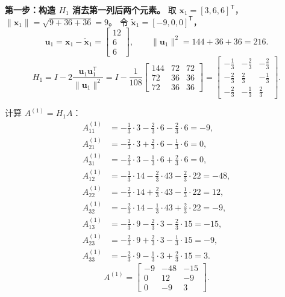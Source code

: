 \documentclass{article}
\begin{document}
\textbf{第一步：构造 $H_1$ 消去第一列后两个元素。}
取 $\bm{x}_1=[3,6,6]^{\mathsf T}$，$\|\bm{x}_1\|=\sqrt{9+36+36}=9$。
令 $\widetilde{\bm{x}}_1=[-9,0,0]^{\mathsf T}$，
\[
\bm{u}_1 = \bm{x}_1 - \widetilde{\bm{x}}_1 = \begin{bmatrix}12\\6\\6\end{bmatrix},\qquad
\|\bm{u}_1\|^2 = 144+36+36 = 216.
\]
\[
H_1 = I - 2\frac{\bm{u}_1\bm{u}_1^{\mathsf T}}{\|\bm{u}_1\|^2}
= I - \frac{1}{108}\begin{bmatrix}144 & 72 & 72\\72 & 36 & 36\\72 & 36 & 36\end{bmatrix}
= \begin{bmatrix}
-\frac13 & -\frac23 & -\frac23\\[4pt]
-\frac23 & \frac23 & -\frac13\\[4pt]
-\frac23 & -\frac13 & \frac23
\end{bmatrix}.
\]

计算 $A^{(1)} = H_1 A$：
\begin{align*}
A^{(1)}_{11} &= -\tfrac13\cdot3-\tfrac23\cdot6-\tfrac23\cdot6 = -9,\\
A^{(1)}_{21} &= -\tfrac23\cdot3+\tfrac23\cdot6-\tfrac13\cdot6 = 0,\\
A^{(1)}_{31} &= -\tfrac23\cdot3-\tfrac13\cdot6+\tfrac23\cdot6 = 0,\\
A^{(1)}_{12} &= -\tfrac13\cdot14-\tfrac23\cdot43-\tfrac23\cdot22 = -48,\\
A^{(1)}_{22} &= -\tfrac23\cdot14+\tfrac23\cdot43-\tfrac13\cdot22 = 12,\\
A^{(1)}_{32} &= -\tfrac23\cdot14-\tfrac13\cdot43+\tfrac23\cdot22 = -9,\\
A^{(1)}_{13} &= -\tfrac13\cdot9-\tfrac23\cdot3-\tfrac23\cdot15 = -15,\\
A^{(1)}_{23} &= -\tfrac23\cdot9+\tfrac23\cdot3-\tfrac13\cdot15 = -9,\\
A^{(1)}_{33} &= -\tfrac23\cdot9-\tfrac13\cdot3+\tfrac23\cdot15 = 3.
\end{align*}
\[
A^{(1)} = \begin{bmatrix}
-9 & -48 & -15\\
0 & 12 & -9\\
0 & -9 & 3
\end{bmatrix}.
\]
\end{document}

